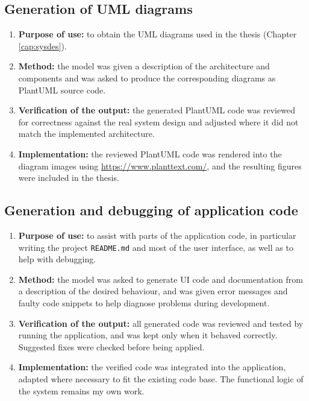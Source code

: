 \subsection*{Generation of UML diagrams}
\begin{enumerate}
    \item \textbf{Purpose of use:} to obtain the UML diagrams used in the thesis (Chapter \ref{cap:sysdes}).
    \item \textbf{Method:} the model was given a description of the architecture and components and was asked to produce the corresponding diagrams as PlantUML source code.
    \item \textbf{Verification of the output:} the generated PlantUML code was reviewed for correctness against the real system design and adjusted where it did not match the implemented architecture.
    \item \textbf{Implementation:} the reviewed PlantUML code was rendered into the diagram images using \url{https://www.planttext.com/}, and the resulting figures were included in the thesis.
\end{enumerate}

\subsection*{Generation and debugging of application code}
\begin{enumerate}
    \item \textbf{Purpose of use:} to assist with parts of the application code, in particular writing the project \texttt{README.md} and most of the user interface, as well as to help with debugging.
    \item \textbf{Method:} the model was asked to generate UI code and documentation from a description of the desired behaviour, and was given error messages and faulty code snippets to help diagnose problems during development.
    \item \textbf{Verification of the output:} all generated code was reviewed and tested by running the application, and was kept only when it behaved correctly. Suggested fixes were checked before being applied.
    \item \textbf{Implementation:} the verified code was integrated into the application, adapted where necessary to fit the existing code base. The functional logic of the system remains my own work.
\end{enumerate}
